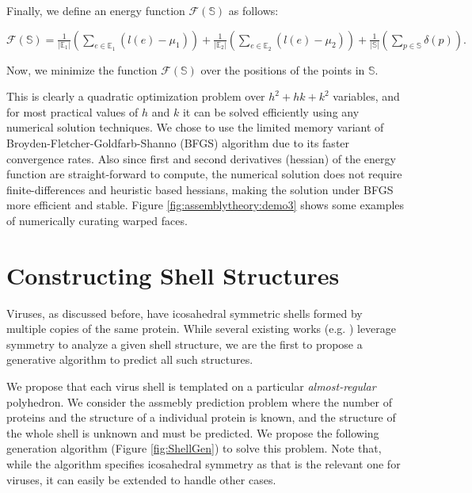 \documentclass[11pt]{article}
\newcommand{\1}{\mathds{1}}
\begin{document}
Finally, we define an energy function $\mathcal{F}(\mathbb{S})$ as follows:

$\mathcal{F}(\mathbb{S}) = \frac{1}{|\mathbb{E}_1|} (\sum_{e \in \mathbb{E}_1} (l(e) - \mu_1)) + \frac{1}{|\mathbb{E}_2|} (\sum_{e \in \mathbb{E}_2} (l(e) - \mu_2)) + \frac{1}{|\mathbb{S}|} (\sum_{p\in \mathbb{S}} \delta(p)).$

Now, we minimize the function $\mathcal{F}(\mathbb{S})$ over the positions of the points in $\mathbb{S}$.

This is clearly a quadratic optimization problem over $h^2+hk+k^2$ variables, and for most practical values of $h$ and $k$ it can be solved efficiently using any numerical solution techniques. We chose to use the limited memory variant of Broyden-Fletcher-Goldfarb-Shanno (BFGS) algorithm \cite{Byrd_Lu_Nocedal_Zhu_1995} due to its faster convergence rates. Also since first and second derivatives (hessian) of the energy function are straight-forward to compute, the numerical solution does not require finite-differences and heuristic based hessians, making the solution under BFGS more efficient and stable. Figure \ref{fig:assemblytheory:demo3} shows some examples of numerically curating warped faces.

\section{Constructing Shell Structures}
Viruses, as discussed before, have icosahedral symmetric shells formed by multiple copies of the same protein. While several existing works (e.g. \cite{berger94,zlotnick05,zandi05,Rapaport_2004,Bona_Sitharam_Vince_2011,Bahadur_Rodier_Janin_2007,Carrillo-Tripp_Brooks_Reddy_2008,Cheng_Brooks_2013}) leverage symmetry to analyze a given shell structure, we are the first to propose a generative algorithm to predict all such structures.

We propose that each virus shell is templated on a particular \emph{almost-regular} polyhedron. We consider the assmebly prediction problem where the number of proteins and the structure of a individual protein is known, and the structure of the whole shell is unknown and must be predicted. We propose the following generation algorithm (Figure \ref{fig:ShellGen}) to solve this problem. Note that, while the algorithm specifies icosahedral symmetry as that is the relevant one for viruses, it can easily be extended to handle other cases.
\end{document}
